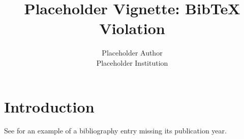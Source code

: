 \documentclass{jss}
\author{Placeholder Author\\Placeholder Institution}
\title{Placeholder Vignette: BibTeX Violation}
\begin{document}
\section{Introduction}

See \cite{jones_undated} for an example of a bibliography entry
missing its publication year.
\end{document}
